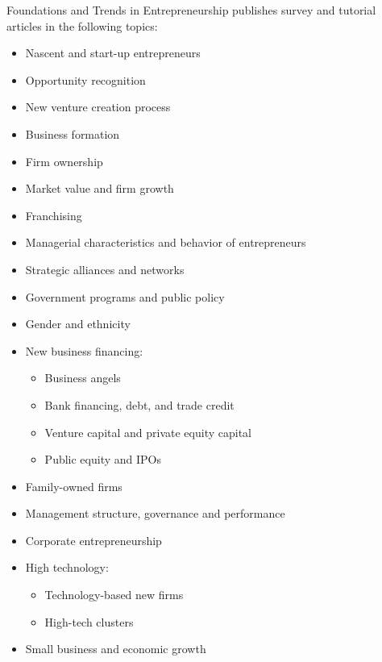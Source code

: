


\journalaimsandscope
 {%
  Foundations and Trends\textsuperscript{\textregistered} in
Entrepreneurship publishes
 survey and tutorial articles in the following topics: 
\begin{multicols}{2}\raggedcolumns
\begin{itemize}
\item{Nascent and start-up entrepreneurs}
\item{Opportunity recognition}
\item{New venture creation process}
\item{Business formation}
\item{Firm ownership}
\item{Market value and firm growth}
\item{Franchising}
\item{Managerial characteristics and behavior of entrepreneurs}
\item{Strategic alliances and networks}
\item{Government programs and public policy}
\item{Gender and ethnicity}
\columnbreak
\item{New business financing:}
	\begin{itemize}
\item{Business angels}
\item{Bank financing, debt, and trade credit}
\item{Venture capital and private equity capital}
\item{Public equity and IPOs} 
\end{itemize}
\item{Family-owned firms}
\item{Management structure, governance and performance}
\item{Corporate entrepreneurship}
\item{High technology:}
	\begin{itemize}
        \item{Technology-based new firms}
        \item{High-tech clusters}
        \end{itemize}
\item{Small business and economic growth}
\end{itemize}
 \end{multicols}
 }

